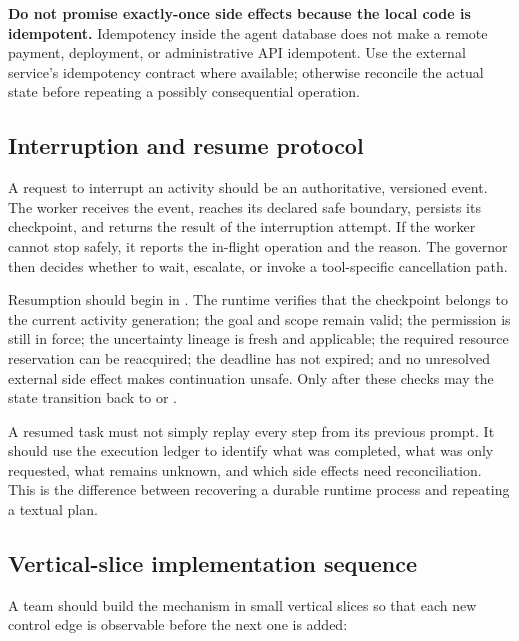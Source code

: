 \begin{warningbox}
\textbf{Do not promise exactly-once side effects because the local code is idempotent.} Idempotency inside the agent database does not make a remote payment, deployment, or administrative API idempotent. Use the external service's idempotency contract where available; otherwise reconcile the actual state before repeating a possibly consequential operation.
\end{warningbox}

\subsection{Interruption and resume protocol}
\label{sec:ch16-resume-protocol}

A request to interrupt an activity should be an authoritative, versioned event. The worker receives the event, reaches its declared safe boundary, persists its checkpoint, and returns the result of the interruption attempt. If the worker cannot stop safely, it reports the in-flight operation and the reason. The governor then decides whether to wait, escalate, or invoke a tool-specific cancellation path.

Resumption should begin in \texttt{}. The runtime verifies that the checkpoint belongs to the current activity generation; the goal and scope remain valid; the permission is still in force; the uncertainty lineage is fresh and applicable; the required resource reservation can be reacquired; the deadline has not expired; and no unresolved external side effect makes continuation unsafe. Only after these checks may the state transition back to \texttt{} or \texttt{}.

A resumed task must not simply replay every step from its previous prompt. It should use the execution ledger to identify what was completed, what was only requested, what remains unknown, and which side effects need reconciliation. This is the difference between recovering a durable runtime process and repeating a textual plan.

\subsection{Vertical-slice implementation sequence}
\label{sec:ch16-implementation-sequence}

A team should build the mechanism in small vertical slices so that each new control edge is observable before the next one is added:

